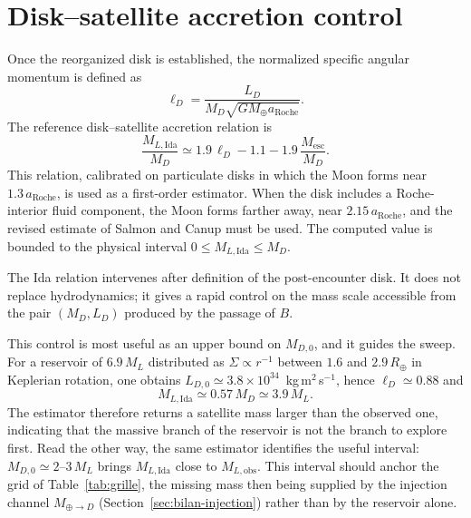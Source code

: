 \documentclass[11pt,a4paper,openany]{report}
\newcommand{\Mt}{M_{\oplus}}
\newcommand{\Rt}{R_{\oplus}}
\newcommand{\aR}{a_{\mathrm{Roche}}}
\begin{document}
\section{Disk--satellite accretion control}

Once the reorganized disk is established, the normalized specific angular momentum is defined as
\begin{equation}
\ell_D=\frac{L_D}{M_D\sqrt{G\Mt\aR}}.
\label{eq:lD}
\end{equation}
The reference disk--satellite accretion relation \cite{Ida1997} is
\begin{equation}
\frac{M_{L,\mathrm{Ida}}}{M_D}\simeq1.9\,\ell_D-1.1-1.9\,\frac{M_{\mathrm{esc}}}{M_D}.
\label{eq:Ida}
\end{equation}
This relation, calibrated on particulate disks in which the Moon forms near $1.3\,\aR$, is used as
a first-order estimator. When the disk includes a Roche-interior fluid component, the Moon forms
farther away, near $2.15\,\aR$, and the revised estimate of Salmon and Canup \cite{SalmonCanup2012}
must be used. The computed value is bounded to the physical interval
$0\le M_{L,\mathrm{Ida}}\le M_D$.

\begin{lecture}
The Ida relation intervenes after definition of the post-encounter disk. It does not replace
hydrodynamics; it gives a rapid control on the mass scale accessible from the pair $(M_D,L_D)$
produced by the passage of $B$.
\end{lecture}

\begin{controle}
This control is most useful as an upper bound on $M_{D,0}$, and it guides the sweep. For a
reservoir of $6.9\,M_L$ distributed as $\Sigma\propto r^{-1}$ between $1.6$ and $2.9\,\Rt$ in
Keplerian rotation, one obtains $L_{D,0}\simeq3.8\times10^{34}$~kg\,m$^2$\,s$^{-1}$, hence
$\ell_D\simeq0.88$ and
\begin{equation}
M_{L,\mathrm{Ida}}\simeq0.57\,M_D\simeq3.9\,M_L.
\label{eq:controle-Ida}
\end{equation}
The estimator therefore returns a satellite mass larger than the observed one, indicating that the
massive branch of the reservoir is not the branch to explore first. Read the other way, the same
estimator identifies the useful interval: $M_{D,0}\simeq2$--$3\,M_L$ brings $M_{L,\mathrm{Ida}}$
close to $M_{L,\mathrm{obs}}$. This interval should anchor the grid of Table~\ref{tab:grille}, the
missing mass then being supplied by the injection channel $M_{\oplus\to D}$
(Section~\ref{sec:bilan-injection}) rather than by the reservoir alone.
\end{controle}
\end{document}

